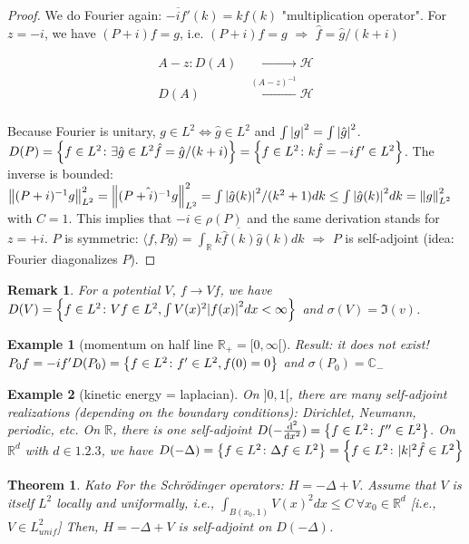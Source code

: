 \documentclass{article}
\newtheorem*{theorem}{Theorem}
\newtheorem*{example}{Example}
\newtheorem*{remark}{Remark}
\newcommand{\RR}{\mathbb{R}}
\newcommand{\CC}{\mathbb{C}}
\newcommand{\cH}{\mathcal{H}}
\newcommand{\sig}{\sigma}
\renewcommand{\sp}[2]{\langle #1,#2 \rangle}
\begin{document}
\begin{proof} 
  We do Fourier again: $\overline{-i f'}(k) = k \hat{f}(k)$ "multiplication operator".
  For $z = -i$, we have $(P + i)f = g$, i.e. $(P + i)f = g$ $\Rightarrow$ $\hat{f} = \hat{g}/(k+i)$
  \begin{align*}
  	A - z \colon D(A) & \xrightarrow{\phantom{(A-z)^{-1}}} \cH \\
                 D(A) & \xleftarrow{(A-z)^{-1}} \cH \\
  \end{align*}

  Because Fourier is unitary, $g \in L^2 \Leftrightarrow \hat{g} \in L^2$
  and $\int \abs{g}^2 = \int \abs{\hat{g}}^2$.
  $D(P) = \qty{ f \in L^2 \colon \exists \hat{g} \in L^2 \hat{f} = \hat{g}/(k+i) } = \qty{ f \in L^2 \colon k \hat{f} = - i f' \in L^2 }$.
  The inverse is bounded: 
  $ \norm{(P + i)^{-1} g}^2_{L^2} = \norm{\hat{(P+i)^{-1}g}}^2_{L^2} 
  = \int \abs{\hat{g}(k)}^2/(k^2+1) dk \le \int \abs{\hat{g}(k)}^2 dk = \norm{g}^2_{L^2}$ with $C = 1$. 
  This implies that $-i \in \rho(P)$ and the same derivation stands for $z=+i$.
  $P$ is symmetric: $\sp{f}{Pg} = \int_\RR k \overline{\hat{f}(k)} \hat{g}(k) dk$
  $\Rightarrow$ $P$ is self-adjoint (idea: Fourier diagonalizes $P$).
\end{proof}

\begin{remark}
  For a potential $V$, $f \to V f$, we have
  $D(V) = \qty{ f \in L^2 \colon V f \in L^2, \int V(x)^2 \abs{f(x)}^2 dx < \infty }$
  and $\sig(V) = \Im(v)$.
\end{remark}

\begin{example}[momentum on half line $\RR_+ = [0,\infty[$]
  Result: it does not exist!
  $P_0 f = - i f'  D(P_0) = \qty{ f \in L^2 \colon f' \in L^2, f(0) = 0 }$
  and $\sig(P_0) = \CC_-$
\end{example}

\begin{example}[kinetic energy = laplacian]
  On $]0,1[$, there are many self-adjoint realizations (depending on the boundary conditions): Dirichlet, Neumann, periodic, etc.
  On $\RR$, there is one self-adjoint $D(-\dv[2]{}{x}) = \qty{ f \in L^2 \colon f'' \in L^2 }$.
  On $\RR^d$ with $d \in \qty{1,2,3}$, we have 
  $D(-\Delta) = \qty{ f \in L^2 \colon \Delta f \in L^2 } = \qty{ f \in L^2 \colon |k|^2 \hat{f} \in L^2 }$
\end{example}

\begin{theorem}{Kato}
  For the Schr\"odinger operators: $H = - \Delta + V$.
  Assume that $V$ is itself $L^2$ locally and uniformally, i.e.,
  $\int_{B(x_0,1)} V(x)^2 dx \le C \ \forall x_0 \in \RR^d$ [i.e., $V \in L^2_{unif}$]
  Then, $H = - \Delta + V$ is self-adjoint on $D(-\Delta)$.
\end{theorem}
\end{document}
